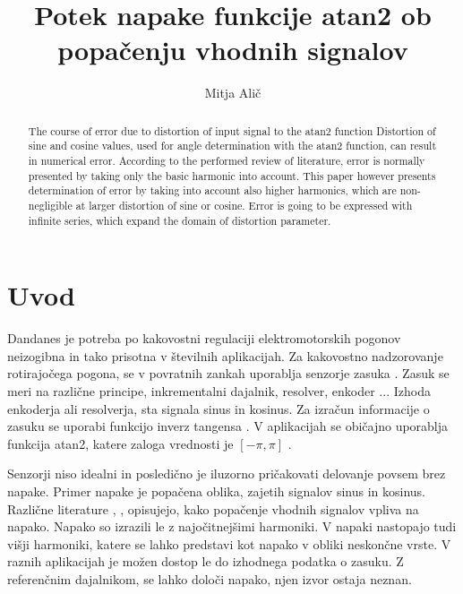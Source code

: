 \documentclass[a4paper]{article}
\begin{document}
\title{Potek napake funkcije atan2 ob popačenju vhodnih signalov}

\author{Mitja Alič} %



\maketitle


\begin{abstract}{The course of error due to distortion of input signal to the atan2 function}
Distortion of sine and cosine values, used for angle determination with the atan2 function, can result in numerical error. According to the performed review of literature, error is normally presented by taking only the basic harmonic into account. This paper however presents determination of error by taking into account also higher harmonics, which are non-negligible at larger distortion of sine or cosine. Error is going to be expressed with infinite series, which expand the domain of distortion parameter. 
\end{abstract}



\section{Uvod}

Dandanes je potreba po kakovostni regulaciji elektromotorskih pogonov neizogibna in tako prisotna v številnih aplikacijah. Za kakovostno nadzorovanje rotirajočega pogona, se v povratnih zankah uporablja senzorje zasuka \cite{uporaba_senzorjev}. Zasuk se meri na različne principe, inkrementalni dajalnik, resolver, enkoder \cite{inkrementalni}\cite{resolver}\cite{enkoder}... Izhoda enkoderja ali resolverja, sta signala sinus in kosinus. Za izračun informacije o zasuku se uporabi funkcijo inverz tangensa \cite{mat1}. V aplikacijah se običajno uporablja funkcija atan2, katere zaloga vrednosti je $[-\pi, \pi]$ \cite{atan}. 


Senzorji niso idealni in posledično je iluzorno pričakovati delovanje povsem brez napake. Primer napake je popačena oblika, zajetih signalov sinus in kosinus. Različne literature \cite{RLS1}, \cite{RLS2}, \cite{RLS3} opisujejo, kako popačenje vhodnih signalov vpliva na napako. Napako so izrazili le z najočitnejšimi harmoniki. V napaki nastopajo tudi višji harmoniki, katere se lahko predstavi kot napako v obliki neskončne vrste. V raznih aplikacijah je možen dostop le do izhodnega podatka o zasuku. Z referenčnim dajalnikom, se lahko določi napako, njen izvor ostaja neznan.
\end{document}
